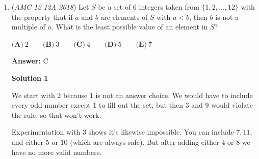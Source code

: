 \begin{enumerate}
 Plugging into point-slope we find that the equation of the crease is, $y-y_1=m(x-x_1)\implies y-\frac{3}{2}=\frac{4}{3}(x-2)\implies y=\frac{4}{3}x-\frac{7}{6}$

 Using 0 for y, we see that the crease intersects $AC$ at $(\frac{7}{8},0)$. 

 By the Distance Formula,

 $(2-\frac{7}{8})^2+({\frac{3}{2}})^2=d^2 \implies d^2=\frac{225}{64} \implies d=\boxed{\textbf{(D) }\frac{15}{8}}$




\textbf{Solution 6}

Let $D$ be a point on AC such that $AD=DB$ and $\triangle{ADB}$ is isosceles. The altitude of this triangle is the crease of the paper triangle.

 Setting $DC=x$, we have a right triangle $\triangle{BCD}$ with legs of x and 3, and, because $AD=DB,$ hypotenuse of $(4-x)$.

 $x^2+3^2=(4-x)^2 \implies x^2+9=16-8x+x^2 \implies 8x=7 \implies x=\frac{7}{8}$

 The area of $\triangle{BCD}  \text{ is thus} = \frac{7}{8}*3*\frac{1}{2} \implies \frac{21}{16}.$ Because $[ADB]=[ABC]-[BCD],$ we can plug in and see that $[ADB]=6-\frac{21}{16}=\frac{75}{16}.$

 Since $A=\frac{bh}{2}$, we get $\frac{75}{16}=\frac{5h}{2} \implies 5h=\frac{75}{8} \implies h=\boxed{\textbf{(D) }\frac{15}{8}}$



	\item (\textit{AMC 12 12A 2018}) Let $S$ be a set of $6$ integers taken from $\{1,2,\dots,12\}$ with the property that if $a$ and $b$ are elements of $S$ with $a<b$, then $b$ is not a multiple of $a$. What is the least possible value of an element in $S$?


 $\textbf{(A)}\ 2\qquad\textbf{(B)}\ 3\qquad\textbf{(C)}\ 4\qquad\textbf{(D)}\ 5\qquad\textbf{(E)}\ 7$

 \textbf{Answer: }C



\textbf{Solution 1}

We start with $2$ because $1$ is not an answer choice. We would have to include every odd number except $1$ to fill out the set, but then $3$ and $9$ would violate the rule, so that won't work.

 Experimentation with $3$ shows it's likewise impossible. You can include $7,11,$ and either $5$ or $10$ (which are always safe). But after adding either $4$ or $8$ we have no more valid numbers.


\end{enumerate}
